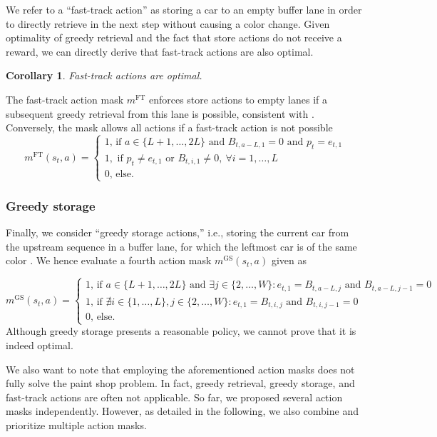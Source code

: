 \documentclass[11pt]{elsarticle}
\newtheorem{corollary}{Corollary}[thm]
\begin{document}
We refer to a ``fast-track action'' as storing a car to an empty buffer lane in order to directly retrieve in the next step without causing a color change. Given optimality of greedy retrieval and the fact that store actions do not receive a reward, we can directly derive that fast-track actions are also optimal.
\begin{corollary}
\label{thm:fast-track}
Fast-track actions are optimal.
\end{corollary}
The fast-track action mask $m^{\text{FT}}$ enforces store actions to empty lanes if a subsequent greedy retrieval from this lane is possible, consistent with . Conversely, the mask allows all actions if a fast-track action is not possible
\begin{equation}
m^{\text{FT}}(s_t,a)=\begin{cases}
1\text{, if } a\in\{L+1,\dots,2L\} \text{ and } B_{t,a-L,1}=0 \text{ and } p_t=e_{t,1}\\
1, \text{ if } p_t\neq e_{t,1} \text{ or } B_{t,i,1}\neq 0, \ \forall i=1,\dots, L \\
0\text{, else}.
\end{cases}
\end{equation}

\subsubsection*{Greedy storage}

Finally, we consider ``greedy storage actions,'' i.e., storing the current car from the upstream sequence in a buffer lane, for which the leftmost car is of the same color \citep[e.g.,][]{Leng.2020,Leng.2023}. We hence evaluate a fourth action mask $m^{\text{GS}}(s_t,a)$ given as

\begin{equation}
m^{\text{GS}}(s_t,a)=\begin{cases}
1\text{, if } a\in\{L+1,\dots,2L\} \text{ and } \exists j \in\{2,\dots,W\}\colon e_{t,1}=B_{t,a-L,j} \text{ and } B_{t,a-L,j-1}=0 \\
1 \text{, if } \nexists i \in\{1,\dots,L\}, j \in\{2,\dots,W\}\colon e_{t,1}=B_{t,i,j} \text{ and } B_{t,i,j-1}=0\\
0\text{, else}.
\end{cases}
\end{equation}
Although greedy storage presents a reasonable policy, we cannot prove that it is indeed optimal.

We also want to note that employing the aforementioned action masks does not fully solve the paint shop problem. In fact, greedy retrieval, greedy storage, and fast-track actions are often not applicable. So far, we proposed several action masks independently. However, as detailed in the following, we also combine and prioritize multiple action masks.
\end{document}
